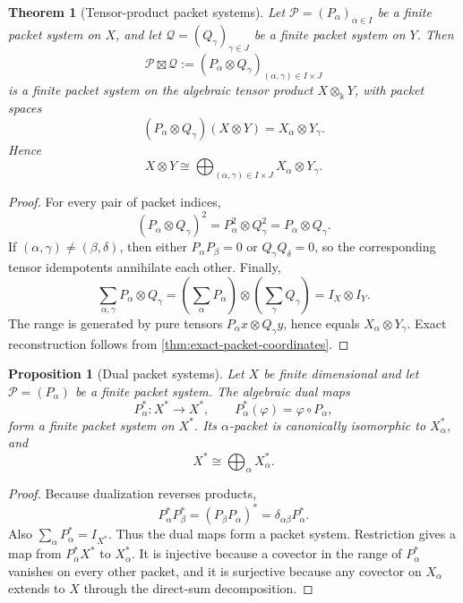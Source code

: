 \documentclass[11pt]{article}
\newtheorem{theorem}{Theorem}[section]
\newtheorem{proposition}[proposition]{Proposition}
\theoremstyle{definition}
\theoremstyle{remark}
\theoremstyle{definition}\newtheorem{example}[theorem]{Example}
\newcommand{\bbk}{\Bbbk}
\newcommand{\Pcal}{\mathcal P}
\newcommand{\Qcal}{\mathcal Q}
\newcommand{\RecordID}[1]{\label{record:#1}}
\newcommand{\Depends}[1]{}
\newcommand{\Exports}[1]{}
\begin{document}
\begin{theorem}[Tensor-product packet systems]
\label{thm:tensor-packet-system}
Let \(\Pcal=(P_\alpha)_{\alpha\in I}\) be a finite packet system on \(X\), and let \(\Qcal=(Q_\gamma)_{\gamma\in J}\) be a finite packet system on \(Y\).  Then
\[
\Pcal\boxtimes\Qcal
:=
(P_\alpha\otimes Q_\gamma)_{(\alpha,\gamma)\in I\times J}
\]
is a finite packet system on the algebraic tensor product \(X\otimes_{\bbk}Y\), with packet spaces
\[
(P_\alpha\otimes Q_\gamma)(X\otimes Y)
=X_\alpha\otimes Y_\gamma.
\]
Hence
\[
\boxed{
X\otimes Y
\cong
\bigoplus_{(\alpha,\gamma)\in I\times J}
X_\alpha\otimes Y_\gamma.
}
\]
\end{theorem}
\RecordID{PSC-I-T-TENSOR-PACKET-SYSTEM}
\Depends{PSC-I-D-PACKET-SYSTEM and PSC-I-T-EXACT-PACKET-COORDINATES.}
\Exports{Tensor refinement for quantum, signal, arithmetic, and multivariate realizations.}

\begin{proof}
For every pair of packet indices,
\[
(P_\alpha\otimes Q_\gamma)^2
=P_\alpha^2\otimes Q_\gamma^2
=P_\alpha\otimes Q_\gamma.
\]
If \((\alpha,\gamma)\neq(\beta,\delta)\), then either \(P_\alpha P_\beta=0\) or \(Q_\gamma Q_\delta=0\), so the corresponding tensor idempotents annihilate each other.  Finally,
\[
\sum_{\alpha,\gamma}P_\alpha\otimes Q_\gamma
=
\left(\sum_\alpha P_\alpha\right)
\otimes
\left(\sum_\gamma Q_\gamma\right)
=I_X\otimes I_Y.
\]
The range is generated by pure tensors \(P_\alpha x\otimes Q_\gamma y\), hence equals \(X_\alpha\otimes Y_\gamma\).  Exact reconstruction follows from \cref{thm:exact-packet-coordinates}.
\end{proof}

\begin{proposition}[Dual packet systems]
\label{prop:dual-packet-system}
Let \(X\) be finite dimensional and let \(\Pcal=(P_\alpha)\) be a finite packet system.  The algebraic dual maps
\[
P_\alpha^*:X^*\to X^*,
\qquad
P_\alpha^*(\varphi)=\varphi\circ P_\alpha,
\]
form a finite packet system on \(X^*\).  Its \(\alpha\)-packet is canonically isomorphic to \(X_\alpha^*\), and
\[
X^*\cong\bigoplus_\alpha X_\alpha^*.
\]
\end{proposition}
\RecordID{PSC-I-P-DUAL-PACKET-SYSTEM}
\Depends{PSC-I-D-PACKET-SYSTEM and PSC-I-T-EXACT-PACKET-COORDINATES.}
\Exports{Dual observables, covectors, trace pairings, and adjoint packet calculations.}

\begin{proof}
Because dualization reverses products,
\[
P_\alpha^*P_\beta^*=(P_\beta P_\alpha)^*
=\delta_{\alpha\beta}P_\alpha^*.
\]
Also \(\sum_\alpha P_\alpha^*=I_{X^*}\).  Thus the dual maps form a packet system.  Restriction gives a map from \(P_\alpha^*X^*\) to \(X_\alpha^*\).  It is injective because a covector in the range of \(P_\alpha^*\) vanishes on every other packet, and it is surjective because any covector on \(X_\alpha\) extends to \(X\) through the direct-sum decomposition.
\end{proof}
\end{document}
